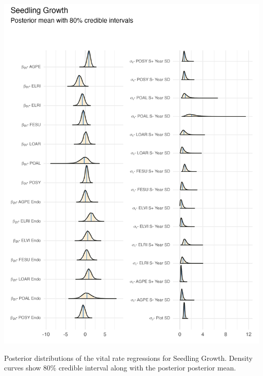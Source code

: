 \documentclass[lineno, sn-basic]{sn-jnl}%
\providecommand{\DIFaddbegin}{} %
\providecommand{\DIFaddend}{} %
\providecommand{\DIFdelbegin}{} %
\providecommand{\DIFdelend}{} %
\providecommand{\DIFaddbeginFL}{} %
\providecommand{\DIFaddendFL}{} %
\providecommand{\DIFdelbeginFL}{} %
\providecommand{\DIFdelendFL}{} %
\newcommand{\DIFscaledelfig}{0.5}
\newlength{\DIFdelgraphicswidth} %
\newlength{\DIFdelgraphicsheight} %
\newcommand{\DIFaddincludegraphics}[2][]{{\color{blue}\fbox{\DIFOincludegraphics[#1]{#2}}}} %
\newcommand{\DIFdelincludegraphics}[2][]{%
\sbox{\DIFdelgraphicsbox}{\DIFOincludegraphics[#1]{#2}}%
\settoboxwidth{\DIFdelgraphicswidth}{\DIFdelgraphicsbox} %
\settoboxtotalheight{\DIFdelgraphicsheight}{\DIFdelgraphicsbox} %
\scalebox{\DIFscaledelfig}{%
\parbox[b]{\DIFdelgraphicswidth}{\usebox{\DIFdelgraphicsbox}\\[-\baselineskip] \rule{\DIFdelgraphicswidth}{0em}}\llap{\resizebox{\DIFdelgraphicswidth}{\DIFdelgraphicsheight}{%
\setlength{\unitlength}{\DIFdelgraphicswidth}%
\begin{picture}(1,1)%
\thicklines\linethickness{2pt} %
{\color[rgb]{1,0,0}\put(0,0){\framebox(1,1){}}}%
{\color[rgb]{1,0,0}\put(0,0){\line( 1,1){1}}}%
{\color[rgb]{1,0,0}\put(0,1){\line(1,-1){1}}}%
\end{picture}%
}\hspace*{3pt}}} %
} %
\DeclareRobustCommand{\DIFaddbegin}{\DIFOaddbegin \let\includegraphics\DIFaddincludegraphics} %
\DeclareRobustCommand{\DIFaddend}{\DIFOaddend \let\includegraphics\DIFOincludegraphics} %
\DeclareRobustCommand{\DIFdelbegin}{\DIFOdelbegin \let\includegraphics\DIFdelincludegraphics} %
\DeclareRobustCommand{\DIFdelend}{\DIFOaddend \let\includegraphics\DIFOincludegraphics} %
\DeclareRobustCommand{\DIFaddbeginFL}{\DIFOaddbeginFL \let\includegraphics\DIFaddincludegraphics} %
\DeclareRobustCommand{\DIFaddendFL}{\DIFOaddendFL \let\includegraphics\DIFOincludegraphics} %
\DeclareRobustCommand{\DIFdelbeginFL}{\DIFOdelbeginFL \let\includegraphics\DIFdelincludegraphics} %
\DeclareRobustCommand{\DIFdelendFL}{\DIFOaddendFL \let\includegraphics\DIFOincludegraphics} %
\begin{document}
\DIFdelbegin %
\DIFdelendFL \DIFaddbeginFL \begin{myfigure}[H]
	\DIFaddendFL \centering
	\includegraphics[width = \linewidth]{seedgrow_posteriors_plot.png}
	\DIFdelbeginFL %
\DIFdelendFL \DIFaddbeginFL \caption[Posterior distributions of the vital rate regressions for Seedling Growth]{\DIFaddendFL Posterior distributions of the vital rate regressions for Seedling Growth. Density curves show $80\%$ credible interval along with the posterior posterior mean.}
\DIFdelbeginFL %
\DIFdelend \DIFaddbegin \end{myfigure}
\DIFaddend 
\end{document}
